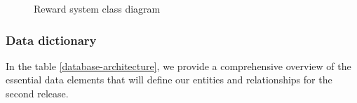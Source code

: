 \begin{figure}[H]
    \centering
    \caption{Reward system class diagram}
    \label{fig:reward_system-class}
\end{figure}

\subsubsection*{Data dictionary}
In the table \ref{database-architecture}, we provide a comprehensive overview of the essential data elements
that will define our entities and relationships for the second release.


